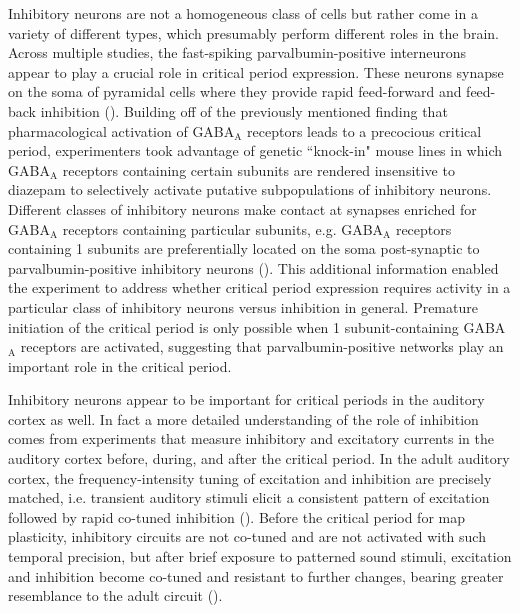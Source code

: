Inhibitory neurons are not a homogeneous class of cells but rather come in a variety of different types, which presumably perform different roles in the brain. Across multiple studies, the fast-spiking parvalbumin-positive interneurons appear to play a crucial role in critical period expression. These neurons synapse on the soma of pyramidal cells where they provide rapid feed-forward and feed-back inhibition (\cite{Markram2004}). Building off of the previously mentioned finding that pharmacological activation of GABA$_\mathrm{A}$ receptors leads to a precocious critical period, experimenters took advantage of genetic ``knock-in" mouse lines in which GABA$_\mathrm{A}$ receptors containing certain subunits are rendered insensitive to diazepam to selectively activate putative subpopulations of inhibitory neurons. Different classes of inhibitory neurons make contact at synapses enriched for GABA$_\mathrm{A}$ receptors containing particular subunits, e.g. GABA$_\mathrm{A}$ receptors containing \textalpha{}1 subunits are preferentially located on the soma post-synaptic to parvalbumin-positive inhibitory neurons (\cite{Fagiolini2004}). This additional information enabled the experiment to address whether critical period expression requires activity in a particular class of inhibitory neurons versus inhibition in general.  Premature initiation of the critical period is only possible when \textalpha{}1 subunit-containing GABA$_\mathrm{A}$ receptors are activated, suggesting that parvalbumin-positive networks play an important role in the critical period.

Inhibitory neurons appear to be important for critical periods in the auditory cortex as well. In fact a more detailed understanding of the role of inhibition comes from experiments that measure inhibitory and excitatory currents in the auditory cortex before, during, and after the critical period. In the adult auditory cortex, the frequency-intensity tuning of excitation and inhibition are precisely matched, i.e. transient auditory stimuli elicit a consistent pattern of excitation followed by rapid co-tuned inhibition (\cite{Wehr2003, Wehr2005}). Before the critical period for map plasticity, inhibitory circuits are not co-tuned and are not activated with such temporal precision, but after brief exposure to patterned sound stimuli, excitation and inhibition become co-tuned and resistant to further changes, bearing greater resemblance to the adult circuit (\cite{Dorrn2010}).

